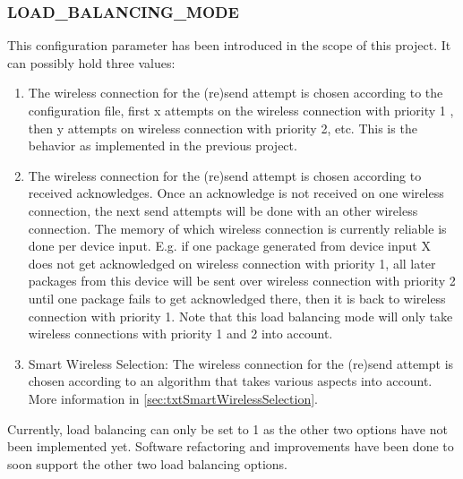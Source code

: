 \subsubsection{LOAD\_BALANCING\_MODE}
This configuration parameter has been introduced in the scope of this project. It can possibly hold three values:
\begin{enumerate}
    \item The wireless connection for the (re)send attempt is chosen according to the configuration file, first x attempts on the wireless connection with priority 1 , then y attempts on wireless connection with priority 2, etc. This is the behavior as implemented in the previous project.
    \item The wireless connection for the (re)send attempt is chosen according to received acknowledges. Once an acknowledge is not received on one wireless connection, the next send attempts will be done with an other wireless connection. The memory of which wireless connection is currently reliable is done per device input. E.g. if one package generated from device input X does not get acknowledged on wireless connection with priority 1, all later packages from this device will be sent over wireless connection with priority 2 until one package fails to get acknowledged there, then it is back to wireless connection with priority 1. Note that this load balancing mode will only take wireless connections with priority 1 and 2 into account.
    \item Smart Wireless Selection: The wireless connection for the (re)send attempt is chosen according to an algorithm that takes various aspects into account. More information in \autoref{sec:txtSmartWirelessSelection}.
\end{enumerate}
Currently, load balancing can only be set to 1 as the other two options have not been implemented yet. Software refactoring and improvements have been done to soon support the other two load balancing options.
%
